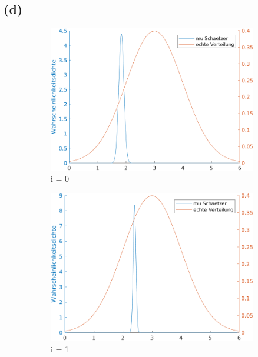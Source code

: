 \documentclass[a4paper]{scrartcl}
\begin{document}
\subsection*{(d)}
\begin{figure}[H]
	\centering
	\begin{subfigure}{.5\textwidth}
		\centering
		\includegraphics*[scale = 0.4]{assignment3_data/plots/q3_i0}
		\caption*{i = 0}
	\end{subfigure}%
	\begin{subfigure}{.5\textwidth}
		\centering
		\includegraphics*[scale = 0.4]{assignment3_data/plots/q3_i1}
		\caption*{i = 1}
	\end{subfigure}
	\begin{subfigure}{.5\textwidth}
		\centering

\end{subfigure}
\end{figure}
\end{document}
